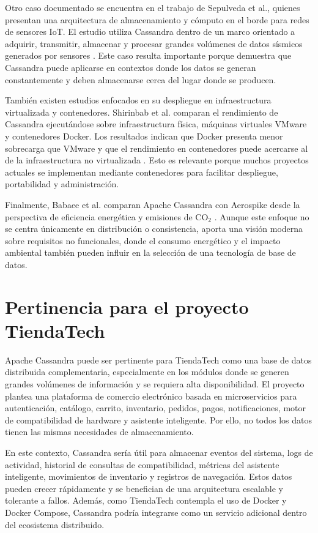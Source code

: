 \documentclass[12pt,a4paper]{article}
\begin{document}
Otro caso documentado se encuentra en el trabajo de Sepulveda et al., quienes presentan una arquitectura de almacenamiento y cómputo en el borde para redes de sensores IoT. El estudio utiliza Cassandra dentro de un marco orientado a adquirir, transmitir, almacenar y procesar grandes volúmenes de datos sísmicos generados por sensores \cite{sepulveda2022}. Este caso resulta importante porque demuestra que Cassandra puede aplicarse en contextos donde los datos se generan constantemente y deben almacenarse cerca del lugar donde se producen.

También existen estudios enfocados en su despliegue en infraestructura virtualizada y contenedores. Shirinbab et al. comparan el rendimiento de Cassandra ejecutándose sobre infraestructura física, máquinas virtuales VMware y contenedores Docker. Los resultados indican que Docker presenta menor sobrecarga que VMware y que el rendimiento en contenedores puede acercarse al de la infraestructura no virtualizada \cite{shirinbab2020}. Esto es relevante porque muchos proyectos actuales se implementan mediante contenedores para facilitar despliegue, portabilidad y administración.

Finalmente, Babaee et al. comparan Apache Cassandra con Aerospike desde la perspectiva de eficiencia energética y emisiones de CO$_2$ \cite{babaee2022}. Aunque este enfoque no se centra únicamente en distribución o consistencia, aporta una visión moderna sobre requisitos no funcionales, donde el consumo energético y el impacto ambiental también pueden influir en la selección de una tecnología de base de datos.

\section{Pertinencia para el proyecto TiendaTech}

Apache Cassandra puede ser pertinente para TiendaTech como una base de datos distribuida complementaria, especialmente en los módulos donde se generen grandes volúmenes de información y se requiera alta disponibilidad. El proyecto plantea una plataforma de comercio electrónico basada en microservicios para autenticación, catálogo, carrito, inventario, pedidos, pagos, notificaciones, motor de compatibilidad de hardware y asistente inteligente. Por ello, no todos los datos tienen las mismas necesidades de almacenamiento.

En este contexto, Cassandra sería útil para almacenar eventos del sistema, logs de actividad, historial de consultas de compatibilidad, métricas del asistente inteligente, movimientos de inventario y registros de navegación. Estos datos pueden crecer rápidamente y se benefician de una arquitectura escalable y tolerante a fallos. Además, como TiendaTech contempla el uso de Docker y Docker Compose, Cassandra podría integrarse como un servicio adicional dentro del ecosistema distribuido.
\end{document}
